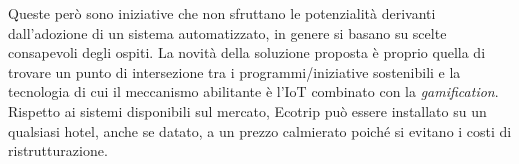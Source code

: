 Queste però sono iniziative che non sfruttano le potenzialità derivanti dall'adozione di un sistema automatizzato, in genere si basano su scelte consapevoli degli ospiti. La novità della soluzione proposta è proprio quella di trovare un punto di intersezione tra i programmi/iniziative sostenibili e la tecnologia di cui il meccanismo abilitante è l'IoT combinato con la \textit{gamification}. Rispetto ai sistemi disponibili sul mercato, Ecotrip può essere installato su un qualsiasi hotel, anche se datato, a un prezzo calmierato poiché si evitano i costi di ristrutturazione.

\newpage